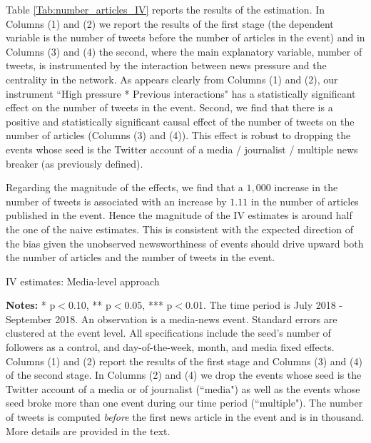 Table \ref{Tab:number_articles_IV} reports the results of the estimation. In Columns (1) and (2) we report the results of the first stage (the dependent variable is the number of tweets before the number of articles in the event) and in Columns (3) and (4) the second, where the main explanatory variable, number of tweets, is instrumented by the interaction between news pressure and the centrality in the network. As appears clearly from Columns (1) and (2), our instrument ``High pressure * Previous interactions" has a statistically significant effect on the number of tweets in the event. Second, we find that there is a positive and statistically significant causal effect of the number of tweets on the number of articles (Columns (3) and (4)). This effect is robust to dropping the events whose seed is the Twitter account of a media / journalist / multiple news breaker (as previously defined).

Regarding the magnitude of the effects, we find that a $1,000$ increase in the number of tweets is associated with an increase by $1.11$ in the number of articles published in the event. Hence the magnitude of the IV estimates is around half the one of the naive estimates. This is consistent with the expected direction of the bias given the unobserved newsworthiness of events should drive upward both the number of articles and the number of tweets in the event.


\begin{table}
\caption{IV estimates: Media-level approach}
\begin{center}
	
\end{center}
\begin{spacing}{0.5}
	{\fns \textbf{Notes:} * p$<$0.10, ** p$<$0.05, *** p$<$0.01. The time period is July 2018 - September 2018.  An observation is a media-news event. Standard errors are clustered at the event level. All specifications include the seed's number of followers as a control, and day-of-the-week, month, and media fixed effects. Columns (1) and (2) report the results of the first stage and Columns (3) and (4) of the second stage. In Columns (2) and (4) we drop the events whose seed is the Twitter account of a media or of journalist (``media") as well as the events whose seed broke more than one event during our time period (``multiple"). The number of tweets is computed \textit{before} the first news article in the event and is in thousand. More details are provided in the text.}
\end{spacing}
\label{Tab:number_articles_IV}
\end{table} 


